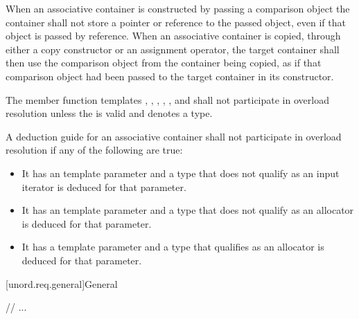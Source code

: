 \documentclass{wg21}
\begin{document}
\pnum
When an associative container is constructed by passing a comparison object the
container shall not store a pointer or reference to the passed object,
even if that object is passed by reference.
When an associative container is copied, through either a copy constructor
or an assignment operator,
the target container shall then use the comparison object from the container
being copied,
as if that comparison object had been passed to the target container in
its constructor.

\pnum
The member function templates
, , ,
, , and 
shall not participate in overload resolution unless
the   is valid
and denotes a type.

\pnum
A deduction guide for an associative container shall not participate in overload resolution
if any of the following are true:
\begin{itemize}
    \item It has an  template parameter
    and a type that does not qualify as an input iterator is deduced for that parameter.

    \item It has an  template parameter
    and a type that does not qualify as an allocator is deduced for that parameter.

    \item It has a  template parameter
    and a type that qualifies as an allocator is deduced for that parameter.
\end{itemize}


[unord.req.general]{General}

// ...
\end{document}
